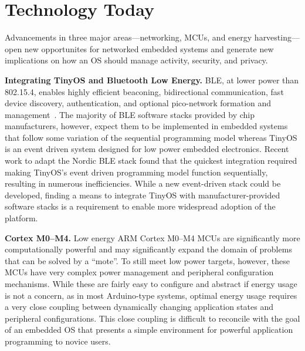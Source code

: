 \section{Technology Today}
Advancements in three major areas---networking, MCUs, and energy
harvesting---open new opportunites for networked embedded systems and generate
new implications on how an OS should manage activity, security, and privacy.


\smallskip\noindent
\textbf{Integrating TinyOS and Bluetooth Low Energy.}
BLE, at lower power than 802.15.4, enables highly efficient beaconing,
bidirectional communication, fast device discovery, authentication, and
optional pico-network formation and management~\cite{ble-overview}.
%
The majority of BLE software stacks provided by chip manufacturers, however, expect them to be
implemented in embedded systems that follow some variation of the sequential
programming model whereas TinyOS is an event driven system designed for low power
embedded electronics. Recent work to adapt the Nordic BLE stack found that the
quickest integration required making TinyOS's event driven programming model
function sequentially, resulting in numerous inefficiencies. While a new
event-driven stack could be developed, finding a means to integrate TinyOS
with manufacturer-provided software stacks is a requirement to enable more
widespread adoption of the platform.


\smallskip\noindent
\textbf{Cortex M0--M4.}
Low energy ARM Cortex M0--M4 MCUs are significantly more computationally
powerful and may significantly expand the domain of problems that can be
solved by a ``mote''.
%
To still meet low power targets, however, these MCUs have very complex power
management and peripheral configuration mechanisms. While these are fairly
easy to configure and abstract if energy usage is not a concern, as in most
Arduino-type systems, optimal energy usage requires a very close coupling
between dynamically changing application states and peripheral configurations.
This close coupling is difficult to reconcile with the goal of an embedded
OS that presents a simple environment for powerful application programming to
novice users.


